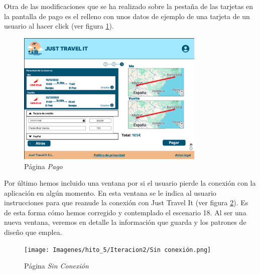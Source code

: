 Otra de las modificaciones que se ha realizado sobre la pestaña de las tarjetas en la pantalla de pago es el relleno con unos datos de ejemplo de una tarjeta de un usuario al hacer click (ver figura \ref{fig:it2_tarjeta}). \\
\begin{figure}[H]
    \centering
    \includegraphics[width = 0.8\textwidth]{Imagenes/hito_5/Iteracion2/Pago con Tarjeta Relleno.png}
    \caption{Página \textit{Pago}}
    \label{fig:it2_tarjeta}
\end{figure}

Por último hemos incluido una ventana por si el usuario pierde la conexión con la aplicación en algún momento. En esta ventana se le indica al usuario instrucciones 
para que reanude la conexión con Just Travel It (ver figura \ref{fig:it2_conexion}). Es de esta forma cómo hemos corregido y contemplado el escenario 18. Al ser una nueva ventana, veremos en detalle la información
que guarda y los patrones de diseño que emplea.
\begin{figure}[H]
    \centering
    \texttt{[image: Imagenes/hito\_5/Iteracion2/Sin conexión.png]}
    \caption{Página \textit{Sin Conexión}}
    \label{fig:it2_conexion}
\end{figure}

